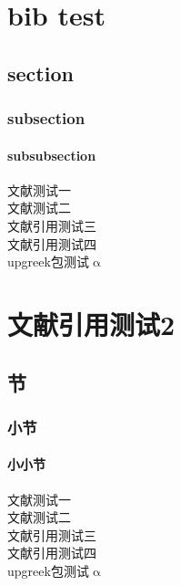 \chapter{bib test}
\section{section}
\subsection{subsection}
\subsubsection{subsubsection}
文献测试一\cite{xiu2010numerical}\\
文献测试二\cite{li2006numerical}\\
文献引用测试三\cite{xia2009real}\\
文献引用测试四\cite{xiu2002wiener}\\
upgreek包测试$\upalpha$


\chapter{文献引用测试2}
\section{节}
\subsection{小节}
\subsubsection{小小节}
文献测试一\cite{xiu2010numerical}\\
文献测试二\cite{li2006numerical}\\
文献引用测试三\cite{xia2009real}\\
文献引用测试四\cite{xiu2002wiener}\\
upgreek包测试$\upalpha$
